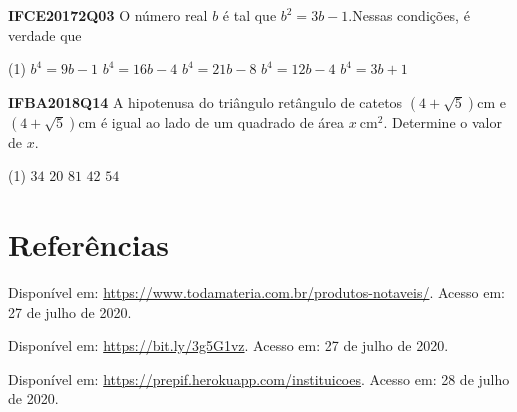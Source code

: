 \documentclass[fleqn,10pt]{article}
\begin{document}
\begin{multicols}{2}
\begin{question}[name = Questão]
\textbf{IFCE20172Q03}
O número real \( b \) é tal que \( b^2=3b-1 \).Nessas condições, é verdade que

\begin{tasks}(1)
        \task \( b^4=9b-1 \)  
        \task \( b^4=16b-4 \)  
        \task \( b^4=21b-8 \)  
        \task \( b^4=12b-4 \)  
        \task \( b^4=3b+1 \)  
    
    \end{tasks}
\end{question}

\begin{question}[name = Questão]
\textbf{IFBA2018Q14}
A hipotenusa do triângulo retângulo de catetos \( (4 + \sqrt{5})\mathrm{cm}\) e \( (4 + \sqrt{5})\mathrm{cm} \) é igual ao lado de um quadrado de área \( x ~ \mathrm{cm^2} \). Determine o valor de \( x \).

\begin{tasks}(1)
        \task \( 34 \)  
        \task \( 20 \)  
        \task \( 81 \)  
        \task \( 42 \)  
        \task \( 54 \)  
    
    \end{tasks}
\end{question}

\end{multicols}

\vfill
\section*{Referências}
\noindent Disponível em: \url{https://www.todamateria.com.br/produtos-notaveis/}. Acesso em: 27 de julho de 2020.

\noindent Disponível em: \url{https://bit.ly/3g5G1vz}. Acesso em: 27 de julho de 2020.

\noindent Disponível em: \url{https://prepif.herokuapp.com/instituicoes}. Acesso em: 28 de julho de 2020.
\end{document}
